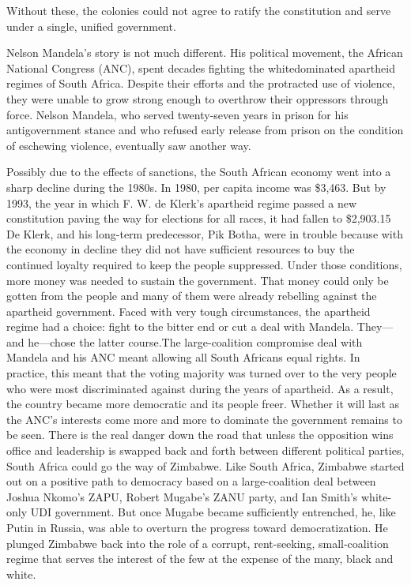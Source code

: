 \documentclass[10pt]{article}
\begin{document}
{\large Without these, the colonies could not agree to ratify the constitution
and serve under a single, unified government.}

{\large Nelson Mandela's story is not much different. His political movement,
the African National Congress (ANC), spent decades fighting the whitedominated
apartheid regimes of South Africa. Despite their efforts and the protracted use
of violence, they were unable to grow strong enough to overthrow their oppressors
through force. Nelson Mandela, who served twenty-seven years in prison for his
antigovernment stance and who refused early release from prison on the condition
of eschewing violence, eventually saw another way.}

{\large Possibly due to the effects of sanctions, the South African economy went
into a sharp decline during the 1980s. In 1980, per capita income was \$3,463.
But by 1993, the year in which F. W. de Klerk's apartheid regime passed a new
constitution paving the way for elections for all races, it had fallen to
\$2,903.15 De Klerk, and his long-term predecessor, Pik Botha, were in trouble
because with the economy in decline they did not have sufficient resources to buy
the continued loyalty required to keep the people suppressed. Under those
conditions, more money was needed to sustain the government. That money could
only be gotten from the people and many of them were already rebelling against
the apartheid government. Faced with very tough circumstances, the apartheid
regime had a choice: fight to the bitter end or cut a deal with Mandela.
They---and he---chose the latter course.The large-coalition compromise deal with
Mandela and his ANC meant allowing all South Africans equal rights. In practice,
this meant that the voting majority was turned over to the very people who were
most discriminated against during the years of apartheid. As a result, the
country became more democratic and its people freer. Whether it will last as the
ANC's interests come more and more to dominate the government remains to be seen.
There is the real danger down the road that unless the opposition wins office and
leadership is swapped back and forth between different political parties, South
Africa could go the way of Zimbabwe. Like South Africa, Zimbabwe started out on a
positive path to democracy based on a large-coalition deal between Joshua Nkomo's
ZAPU, Robert Mugabe's ZANU party, and Ian Smith's white-only UDI government. But
once Mugabe became sufficiently entrenched, he, like Putin in Russia, was able to
overturn the progress toward democratization. He plunged Zimbabwe back into the
role of a corrupt, rent-seeking, small-coalition regime that serves the interest
of the few at the expense of the many, black and white.}
\end{document}

